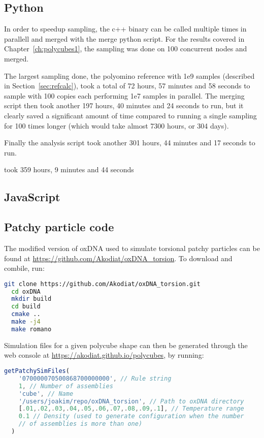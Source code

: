 \subsection{Python}
In order to speedup sampling, the c++ binary can be called multiple times in parallell and merged with the merge python script. For the results covered in Chapter~\ref{ch:polycubes1}, the sampling was done on 100 concurrent nodes and merged.

The largest sampling done, the polyomino reference with 1e9 samples (described in Section~\ref{sec:refcalc}), took a total of 72 hours, 57 minutes and 58 seconds to sample with 100 copies each performing 1e7 samples in parallel. The merging script then took another 197 hours, 40 minutes and 24 seconds to run, but it clearly saved a significant amount of time compared to running a single sampling for 100 times longer (which would take almost 7300 hours, or 304 days).

Finally the analysis script took another 301 hours, 44 minutes and 17 seconds to run.

took 359 hours, 9 minutes and 44 seconds

\subsection{JavaScript}

\subsection{Patchy particle code}
\label{sec:appendix_patchy}
The modified version of oxDNA used to simulate torsional patchy particles can be found at \url{https://github.com/Akodiat/oxDNA_torsion}. To download and combile, run:

\begin{lstlisting}[language=bash]
  git clone https://github.com/Akodiat/oxDNA_torsion.git
  cd oxDNA
  mkdir build
  cd build
  cmake ..
  make -j4
  make romano
\end{lstlisting}

Simulation files for a given polycube shape can then be generated through the web console at \url{https://akodiat.github.io/polycubes}, by running:

\begin{lstlisting}[language=JavaScript]
  getPatchySimFiles(
    '070000070500868700000000', // Rule string
    1, // Number of assemblies
    'cube', // Name
    '/users/joakim/repo/oxDNA_torsion', // Path to oxDNA directory
    [.01,.02,.03,.04,.05,.06,.07,.08,.09,.1], // Temperature range
    0.1 // Density (used to generate configuration when the number
    // of assemblies is more than one)
  )
\end{lstlisting}


